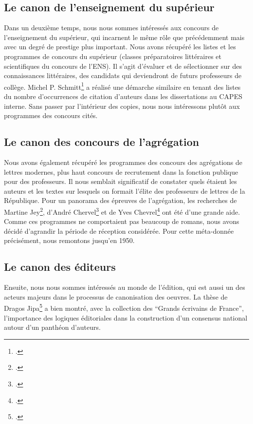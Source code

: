 \subsection{Le canon de l'enseignement du supérieur}

Dans un deuxième temps, nous nous sommes intéressés aux concours de l'enseignement du supérieur, qui incarnent le même rôle que précédemment mais avec un degré de prestige plus important. Nous avons récupéré les listes et les programmes de concours du supérieur (classes préparatoires littéraires et scientifiques du concours de l'ENS). Il s'agit d'évaluer et de sélectionner sur des connaissances littéraires, des candidats qui deviendront de futurs professeurs de collège. Michel P. Schmitt\footcites{schmitt_les_1993} a réalisé une démarche similaire en tenant des listes du nombre d'occurrences de citation d'auteurs dans les dissertations au CAPES interne. Sans passer par l'intérieur des copies, nous nous intéressons plutôt aux programmes des concours cités.

\subsection{Le canon des concours de l'agrégation}

Nous avons également récupéré les programmes des concours des agrégations de lettres modernes, plus haut concours de recrutement dans la fonction publique pour des professeurs. Il nous semblait significatif de constater quels étaient les auteurs et les textes sur lesquels on formait l'élite des professeurs de lettres de la République. Pour un panorama des épreuves de l'agrégation, les recherches de Martine Jey\footcites{jey_canon_2014}, d'André Chervel\footcites{chervel_histoire_1993} et de Yves Chevrel\footcites{chevrel_les_2003} ont été d'une grande aide.
Comme ces programmes ne comportaient pas beaucoup de romans, nous avons décidé d'agrandir la période de réception considérée. Pour cette méta-donnée précisément, nous remontons jusqu'en 1950.  

\subsection{Le canon des éditeurs}

Ensuite, nous nous sommes intéressés au monde de l'édition, qui est aussi un des acteurs majeurs dans le processus de canonisation des oeuvres. La thèse de Dragos Jipa\footcites{jipa_canonisation_2016} a bien montré, avec la collection des \enquote{Grands écrivains de France}, l'importance des logiques éditoriales dans la construction d'un consensus national autour d'un panthéon d'auteurs. 

